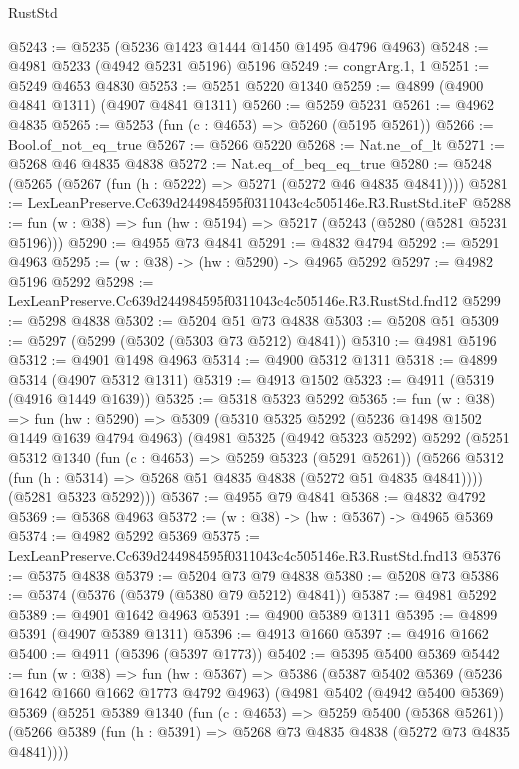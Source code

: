 \begin{lexlean}{RustStd}
\begin{coremodule}
@5243 := @5235 (@5236 @1423 @1444 @1450 @1495 @4796 @4963)
@5248 := @4981 @5233 (@4942 @5231 @5196) @5196
@5249 := congrArg.{1, 1}
@5251 := @5249 @4653 @4830
@5253 := @5251 @5220 @1340
@5259 := @4899 (@4900 @4841 @1311) (@4907 @4841 @1311)
@5260 := @5259 @5231
@5261 := @4962 @4835
@5265 := @5253 (fun (c : @4653) => @5260 (@5195 @5261))
@5266 := Bool.of_not_eq_true
@5267 := @5266 @5220
@5268 := Nat.ne_of_lt
@5271 := @5268 @46 @4835 @4838
@5272 := Nat.eq_of_beq_eq_true
@5280 := @5248 (@5265 (@5267 (fun (h : @5222) => @5271 (@5272 @46 @4835 @4841))))
@5281 := LexLeanPreserve.Cc639d244984595f0311043c4c505146e.R3.RustStd.iteF
@5288 := fun (w : @38) => fun (hw : @5194) => @5217 (@5243 (@5280 (@5281 @5231 @5196)))
@5290 := @4955 @73 @4841
@5291 := @4832 @4794
@5292 := @5291 @4963
@5295 := (w : @38) -> (hw : @5290) -> @4965 @5292
@5297 := @4982 @5196 @5292
@5298 := LexLeanPreserve.Cc639d244984595f0311043c4c505146e.R3.RustStd.fnd12
@5299 := @5298 @4838
@5302 := @5204 @51 @73 @4838
@5303 := @5208 @51
@5309 := @5297 (@5299 (@5302 (@5303 @73 @5212) @4841))
@5310 := @4981 @5196
@5312 := @4901 @1498 @4963
@5314 := @4900 @5312 @1311
@5318 := @4899 @5314 (@4907 @5312 @1311)
@5319 := @4913 @1502
@5323 := @4911 (@5319 (@4916 @1449 @1639))
@5325 := @5318 @5323 @5292
@5365 := fun (w : @38) =>
  fun (hw : @5290) =>
  @5309
    (@5310
      @5325
      @5292
      (@5236 @1498 @1502 @1449 @1639 @4794 @4963)
      (@4981
        @5325
        (@4942 @5323 @5292)
        @5292
        (@5251
          @5312
          @1340
          (fun (c : @4653) => @5259 @5323 (@5291 @5261))
          (@5266 @5312 (fun (h : @5314) => @5268 @51 @4835 @4838 (@5272 @51 @4835 @4841))))
        (@5281 @5323 @5292)))
@5367 := @4955 @79 @4841
@5368 := @4832 @4792
@5369 := @5368 @4963
@5372 := (w : @38) -> (hw : @5367) -> @4965 @5369
@5374 := @4982 @5292 @5369
@5375 := LexLeanPreserve.Cc639d244984595f0311043c4c505146e.R3.RustStd.fnd13
@5376 := @5375 @4838
@5379 := @5204 @73 @79 @4838
@5380 := @5208 @73
@5386 := @5374 (@5376 (@5379 (@5380 @79 @5212) @4841))
@5387 := @4981 @5292
@5389 := @4901 @1642 @4963
@5391 := @4900 @5389 @1311
@5395 := @4899 @5391 (@4907 @5389 @1311)
@5396 := @4913 @1660
@5397 := @4916 @1662
@5400 := @4911 (@5396 (@5397 @1773))
@5402 := @5395 @5400 @5369
@5442 := fun (w : @38) =>
  fun (hw : @5367) =>
  @5386
    (@5387
      @5402
      @5369
      (@5236 @1642 @1660 @1662 @1773 @4792 @4963)
      (@4981
        @5402
        (@4942 @5400 @5369)
        @5369
        (@5251
          @5389
          @1340
          (fun (c : @4653) => @5259 @5400 (@5368 @5261))
          (@5266 @5389 (fun (h : @5391) => @5268 @73 @4835 @4838 (@5272 @73 @4835 @4841))))

\end{coremodule}
\end{lexlean}
